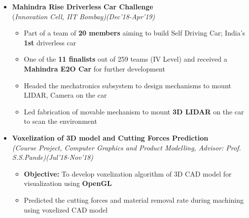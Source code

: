 \documentclass[a4paper,10pt]{article}
\newcommand{\isep}{-2 pt}
\begin{document}
\begin{itemize}
\item \textbf{Mahindra Rise Driverless Car Challenge}  \\
    (\emph{Innovation Cell, IIT Bombay)\hfill (Dec'18-Apr'19)}
    \\[-0.6cm]
    \begin{itemize}\itemsep \isep
        \item Part of a team of \textbf{20 members} aiming to build Self Driving Car; India's \textbf{1st} driverless car
    \item One of the \textbf{11 finalists} out of 259 teams (IV Level) and received a \textbf{Mahindra E2O Car} for further development
     \item Headed the mechatronics subsystem to design mechanisms to mount LIDAR, Camera on the car 
    \item Led fabrication of movable mechanism to mount \textbf{3D LIDAR} on the car to scan the environment 
    \end{itemize}

\item \textbf{Voxelization of 3D model and Cutting Forces Prediction} \\
\emph{(Course Project, Computer Graphics and Product Modelling, Advisor: Prof. S.S.Pande)\hfill (Jul'18-Nov'18)}
    \\ [-0.6cm]
      \begin{itemize}\itemsep \isep
  \item \textbf{Objective:} To develop voxelization algorithm of 3D CAD model for visualization using \textbf{OpenGL}
    \item Predicted the cutting forces and material removal rate during machining using voxelized CAD model
	\end{itemize}
    


\end{itemize}
\end{document}
